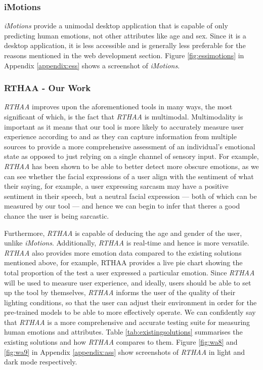 \documentclass[12pt, a4paper]{article}
\newcommand{\np}
    {
    \vskip 0.4cm
    }
\begin{document}
\subsubsection{iMotions}

\textit{iMotions} provide a unimodal desktop application that is capable of only predicting human emotions, not other attributes like age and sex. Since it is a desktop application, it is less accessible and is generally less preferable for the reasons mentioned in the web development section. Figure \ref{fig:essimotions} in Appendix \ref{appendix:ess} shows a screenshot of \textit{iMotions}.

\subsubsection{RTHAA - Our Work}
\label{ourwork}

\textit{RTHAA} improves upon the aforementioned tools in many ways, the most significant of which, is the fact that \textit{RTHAA} is multimodal. Multimodality is important as it means that our tool is more likely to accurately measure user experience according to \cite{poria2017review} and \cite{garcia2018multimodal} as they can capture information from multiple sources to provide a more comprehensive assessment of an individual's emotional state as opposed to just relying on a single channel of sensory input. For example, \textit{RTHAA} has been shown to be able to better detect more obscure emotions, as we can see whether the facial expressions of a user align with the sentiment of what their saying, for example, a user expressing sarcasm may have a positive sentiment in their speech, but a neutral facial expression --- both of which can be measured by our tool --- and hence we can begin to infer that theres a good chance the user is being sarcastic. 
\np
Furthermore, \textit{RTHAA} is capable of deducing the age and gender of the user, unlike \textit{iMotions}. Additionally, \textit{RTHAA} is real-time and hence is more versatile. \textit{RTHAA} also provides more emotion data compared to the existing solutions mentioned above, for example, RTHAA provides a live pie chart showing the total proportion of the test a user expressed a particular emotion. Since \textit{RTHAA} will be used to measure user experience, and ideally, users should be able to set up the tool by themselves, \textit{RTHAA} informs the user of the quality of their lighting conditions, so that the user can adjust their environment in order for the pre-trained models to be able to more effectively operate. We can confidently say that \textit{RTHAA} is a more comprehensive and accurate testing suite for measuring human emotions and attributes. Table \ref{tab:existingsolutions} summarises the existing solutions and how \textit{RTHAA} compares to them. Figure \ref{fig:wa8} and \ref{fig:wa9} in Appendix \ref{appendix:ass} show screenshots of \textit{RTHAA} in light and dark mode respectively.
\end{document}
